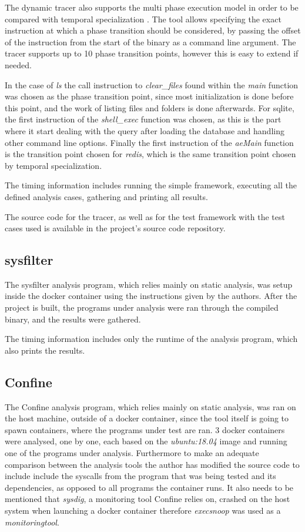 The dynamic tracer also supports the multi phase execution model in order to be compared with temporal specialization \cite{ref_mp_1}. The tool allows specifying the exact instruction at which a phase transition should be considered, by passing the offset of the instruction from the start of the binary as a command line argument. The tracer supports up to 10 phase transition points, however this is easy to extend if needed.

In the case of \textit{ls} the call instruction to \textit{clear\_files} found within the \textit{main} function was chosen as the phase transition point, since most initialization is done before this point, and the work of listing files and folders is done afterwards.
For sqlite, the first instruction of the \textit{shell\_exec} function was chosen, as this is the part where it start dealing with the query after loading the database and handling other command line options.
Finally the first instruction of the \textit{aeMain} function is the transition point chosen for \textit{redis}, which is the same transition point chosen by temporal specialization.

The timing information includes running the simple framework, executing all the defined analysis cases, gathering and printing all results.

The source code for the tracer, as well as for the test framework with the test cases used is available in the project's source code repository.

\subsection {sysfilter}
The sysfilter \cite{ref_sp_3} analysis program, which relies mainly on static analysis, was setup inside the docker container using the instructions given by the authors.
After the project is built, the programs under analysis were ran through the compiled binary, and the results were gathered.

The timing information includes only the runtime of the analysis program, which also prints the results.

\subsection {Confine}
The Confine \cite{ref_sp_2} analysis program, which relies mainly on static analysis, was ran on the host machine, outside of a docker container, since the tool itself is going to spawn containers, where the programs under test are ran.
3 docker containers were analysed, one by one, each based on the \textit{ubuntu:18.04} image and running one of the programs under analysis.
Furthermore to make an adequate comparison between the analysis tools the author has modified the source code to include include the syscalls from the program that was being tested and its dependencies, as opposed to all programs the container runs.
It also needs to be mentioned that \textit{sysdig}, a monitoring tool Confine relies on, crashed on the host system when launching a docker container therefore \textit{execsnoop} was used as a \textit{monitoringtool}.

